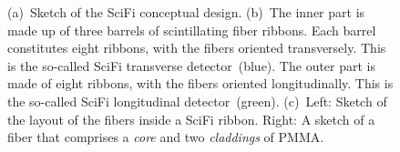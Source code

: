 \begin{refsection}
    
\begin{figure}
    \centering
		\hfill
		\hfill
    \caption{(a)~Sketch of the SciFi conceptual design. (b)~The inner part is made up of three barrels of scintillating fiber ribbons. Each barrel constitutes eight ribbons, with the fibers oriented transversely. This is the so-called SciFi transverse detector~(blue). The outer part is made of eight ribbons, with the fibers oriented longitudinally. This is the so-called SciFi longitudinal detector~(green). (c)~Left: Sketch of the layout of the fibers inside a SciFi ribbon. Right: A sketch of a fiber that comprises a \textit{core} and two \textit{claddings} of PMMA\@.}
    \label{fig:SciFi_ConceptualDesign}
\end{figure}


\end{refsection}
